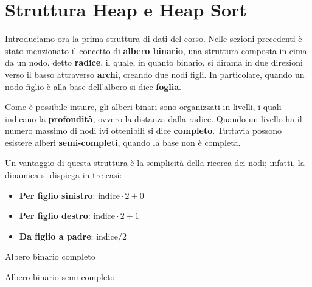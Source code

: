 \section{Struttura Heap e Heap Sort}
Introduciamo ora la prima struttura di dati del corso. Nelle sezioni precedenti è stato menzionato il concetto di \textbf{albero binario}, una struttura composta in cima da un nodo, detto \textbf{radice}, il quale, in quanto binario, si dirama in due direzioni verso il basso attraverso \textbf{archi}, creando due nodi figli. In particolare, quando un nodo figlio è alla base dell'albero si dice \textbf{foglia}.\par
Come è possibile intuire, gli alberi binari sono organizzati in livelli, i quali indicano la \textbf{profondità}, ovvero la distanza dalla radice. Quando un livello ha il numero massimo di nodi ivi ottenibili si dice \textbf{completo}. Tuttavia possono esistere alberi \textbf{semi-completi}, quando la base non è completa.\par
Un vantaggio di questa struttura è la semplicità della ricerca dei nodi; infatti, la dinamica si dispiega in tre casi: \begin{itemize}
	\item \textbf{Per figlio sinistro}: $\text{indice}\cdot 2+0$
	\item \textbf{Per figlio destro}: $\text{indice}\cdot 2+1$
	\item \textbf{Da figlio a padre}: $\text{indice}/2$
\end{itemize}
\begin{minipage}[H]{0.4\linewidth}
	\begin{center}
		Albero binario completo
	\end{center}
\end{minipage}
\hspace{0.2\linewidth}
\begin{minipage}[H]{0.4\linewidth}
	\begin{center}
		Albero binario semi-completo
	\end{center}
\end{minipage}
\vspace{0.01\linewidth}

